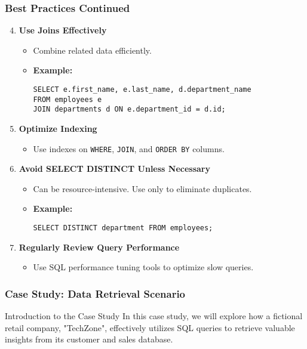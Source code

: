 \documentclass[aspectratio=169]{beamer}
\begin{document}
\begin{frame}[fragile]
    \frametitle{Best Practices Continued}
    \begin{enumerate}
        \setcounter{enumi}{3} %
        \item \textbf{Use Joins Effectively}
            \begin{itemize}
                \item Combine related data efficiently.
                \item \textbf{Example:} 
                \begin{lstlisting}
SELECT e.first_name, e.last_name, d.department_name 
FROM employees e 
JOIN departments d ON e.department_id = d.id;
                \end{lstlisting}
            \end{itemize}

        \item \textbf{Optimize Indexing}
            \begin{itemize}
                \item Use indexes on \texttt{WHERE}, \texttt{JOIN}, and \texttt{ORDER BY} columns.
            \end{itemize}

        \item \textbf{Avoid SELECT DISTINCT Unless Necessary}
            \begin{itemize}
                \item Can be resource-intensive. Use only to eliminate duplicates.
                \item \textbf{Example:} 
                \begin{lstlisting}
SELECT DISTINCT department FROM employees;
                \end{lstlisting}
            \end{itemize}

        \item \textbf{Regularly Review Query Performance}
            \begin{itemize}
                \item Use SQL performance tuning tools to optimize slow queries.
            \end{itemize}
    \end{enumerate}
\end{frame}

\begin{frame}[fragile]
    \frametitle{Case Study: Data Retrieval Scenario}
    \begin{block}{Introduction to the Case Study}
        In this case study, we will explore how a fictional retail company, "TechZone", effectively utilizes SQL queries to retrieve valuable insights from its customer and sales database.
    \end{block}
\end{frame}
\end{document}
